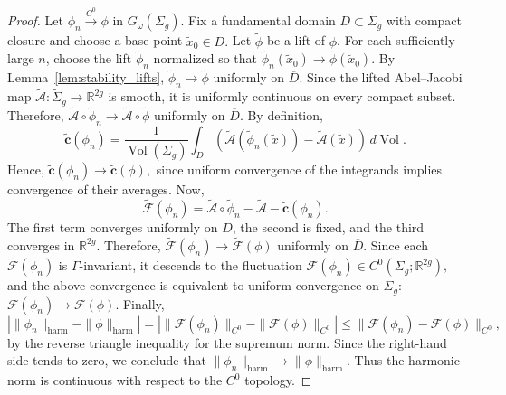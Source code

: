 \documentclass[11pt]{article}
\theoremstyle{definition}
\begin{document}
	\begin{proof}
		Let $\phi_n\xrightarrow{C^0}\phi$ in $G_\omega(\Sigma_g)$. Fix a fundamental
		domain $D\subset\widetilde{\Sigma}_g$ with compact closure and choose a
		base-point $\tilde x_0\in D.$ Let $\widetilde\phi$ be a lift of $\phi$. For each
		sufficiently large $n$, choose the lift $\widetilde\phi_n$ normalized so that
		$\widetilde\phi_n(\tilde x_0) \longrightarrow \widetilde\phi(\tilde x_0).$ By
		Lemma~\ref{lem:stability_lifts}, $\widetilde\phi_n \longrightarrow
		\widetilde\phi$ uniformly on $\overline D$.	Since the lifted Abel--Jacobi map $\widetilde{\mathcal A}: \widetilde{\Sigma}_g
		\longrightarrow \mathbb R^{2g}$ is smooth, it is uniformly continuous on every
		compact subset. Therefore, $\widetilde{\mathcal A}\circ\widetilde\phi_n
		\longrightarrow \widetilde{\mathcal A}\circ\widetilde\phi$ uniformly on
		$\overline D$. By definition,
		\[
		\widetilde{\mathbf c}(\phi_n)
		=
		\frac1{\operatorname{Vol}(\Sigma_g)}
		\int_D
		\left(
		\widetilde{\mathcal A}(\widetilde\phi_n(\tilde x))
		-
		\widetilde{\mathcal A}(\tilde x)
		\right)
		\,d\operatorname{Vol}.
		\]
		Hence, $\widetilde{\mathbf c}(\phi_n) \longrightarrow \widetilde{\mathbf
			c}(\phi),$ since uniform convergence of the integrands implies convergence of
		their averages. Now, 
		\[
		\widetilde{\mathcal F}(\phi_n) = \widetilde{\mathcal A}\circ\widetilde\phi_n -
		\widetilde{\mathcal A} - \widetilde{\mathbf c}(\phi_n).
		\]
		The first term converges uniformly on $\overline D$, the second is fixed, and
		the third converges in $\mathbb R^{2g}$. Therefore, $\widetilde{\mathcal
			F}(\phi_n) \longrightarrow \widetilde{\mathcal F}(\phi)$ uniformly on $\overline
		D$. Since each $\widetilde{\mathcal F}(\phi_n)$ is $\Gamma$-invariant, it
		descends to the fluctuation $\mathcal F(\phi_n) \in C^0(\Sigma_g;\mathbb
		R^{2g}),$ and the above convergence is equivalent to uniform convergence on
		$\Sigma_g$: $\mathcal F(\phi_n) \longrightarrow \mathcal F(\phi).$ Finally,
		\[
		\left| \|\phi_n\|_{\mathrm{harm}} - \|\phi\|_{\mathrm{harm}} \right|
		=
		\left| \|\mathcal F(\phi_n)\|_{C^0} - \|\mathcal F(\phi)\|_{C^0} \right| \le
		\|\mathcal F(\phi_n)-\mathcal F(\phi)\|_{C^0},
		\]
		by the reverse triangle inequality for the supremum norm. Since the right-hand
		side tends to zero, we conclude that $\|\phi_n\|_{\mathrm{harm}} \longrightarrow
		\|\phi\|_{\mathrm{harm}}.$ Thus the harmonic norm is continuous with respect to
		the $C^0$ topology.
	\end{proof}
	
\end{document}

